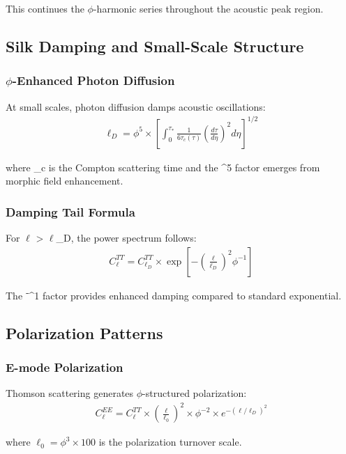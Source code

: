 This continues the $\phi$-harmonic series throughout the acoustic peak region.

\subsection{Silk Damping and Small-Scale Structure}

\subsubsection{$\phi$-Enhanced Photon Diffusion}

At small scales, photon diffusion damps acoustic oscillations:
\begin{align}
\ell_D = \phi^5 \times \left[\int_0^{\tau_*} \frac{1}{6\tau_c(\tau)} \left(\frac{d\tau}{d\eta}\right)^2 d\eta\right]^{1/2}
\end{align}

where \tau_c is the Compton scattering time and the \phi^5 factor emerges from morphic field enhancement.

\subsubsection{Damping Tail Formula}

For $\ell$ > $\ell$_D, the power spectrum follows:
\begin{align}
C_\ell^{TT} = C_{\ell_D}^{TT} \times \exp\left[-\left(\frac{\ell}{\ell_D}\right)^2 \phi^{-1}\right]
\end{align}

The \phi⁻^1 factor provides enhanced damping compared to standard exponential.

\subsection{Polarization Patterns}

\subsubsection{E-mode Polarization}

Thomson scattering generates $\phi$-structured polarization:
\begin{align}
C_\ell^{EE} = C_\ell^{TT} \times \left(\frac{\ell}{\ell_0}\right)^2 \times \phi^{-2} \times e^{-(\ell/\ell_D)^2}
\end{align}

where $\ell_0 = \phi^3 \times 100$ is the polarization turnover scale.

